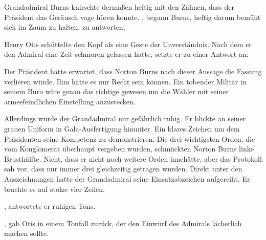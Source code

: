 Grandadmiral Burns knirschte dermaßen heftig mit den Zähnen, dass der Präsident das Geräusch vage hören konnte. , begann Burns, heftig darum bemüht sich im Zaum zu halten, zu antworten, 

\par

Henry Otis schüttelte den Kopf als eine Geste der Unverständnis. Nach dem er den Admiral eine Zeit schmoren gelassen hatte, setzte er zu einer Antwort an: 

\par

Der Präsident hatte erwartet, dass Norton Burns nach dieser Aussage die Fassung verlieren würde. Ihm hätte es nur Recht sein können. Ein tobender Militär in seinem Büro wäre genau das richtige gewesen um die Wähler mit seiner armeefeindlichen Einstellung anzustecken.

\par

Allerdings wurde der Grandadmiral nur gefährlich ruhig. Er blickte an seiner grauen Uniform in Gala-Ausfertigung hinunter. Ein klares Zeichen um dem Präsidenten seine Kompetenz zu demonstrieren. Die drei wichtigsten Orden, die vom Konglomerat überhaupt vergeben wurden, schmückten Norton Burns linke Brusthälfte. Nicht, dass er nicht noch weitere Orden innehätte, aber das Protokoll sah vor, dass nur immer drei gleichzeitig getragen wurden. Direkt unter den Auszeichnungen hatte der Grandadmiral seine Einsatzabzeichen aufgereiht. Er brachte es auf stolze vier Zeilen.

\par

, antwortete er ruhigen Tons. 

\par

, gab Otis in einem Tonfall zurück, der den Einwurf des Admirals lächerlich machen sollte.

